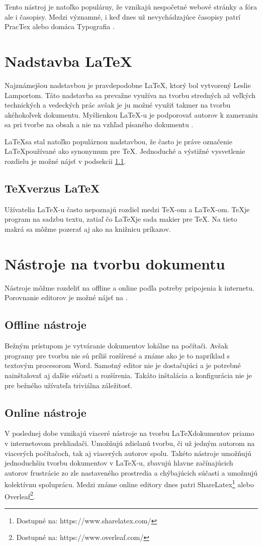 \documentclass[a4paper, 11pt] {article}
\begin{document}
Tento nástroj je natoľko populárny, že vznikajú nespočetné webové stránky a fóra ale i časopisy. Medzi významné, i keď dnes už nevychádzajúce časopisy patrí PracTex\cite{practex} alebo domáca Typografia	\cite{typografia}.

\section{Nadstavba \LaTeX}
Najznámejšou nadstavbou je pravdepodobne \LaTeX, ktorý bol vytvorený Leslie Lamportom. Táto nadstavba sa prevažne využíva na tvorbu stredných až veľkých technických a vedeckých prác avšak je ju možné využiť takmer na tvorbu akéhokoľvek dokumentu. Myšlienkou \LaTeX-u je podporovať autorov k zameraniu sa pri tvorbe na obsah a nie na vzhľad písaného dokumentu \cite{latex_webpage}. 

\LaTeX sa stal natoľko populárnou nadstavbou, že často je práve označenie \LaTeX používané ako synonymum pre \TeX. Jednoduché a výstižné vysvetlenie rozdielu je možné nájsť v podsekcii \ref{tex_vs_latex}.

\subsection{\TeX verzus \LaTeX}
\label{tex_vs_latex}
Užívatelia \LaTeX-u často nepoznajú rozdiel medzi \TeX-om a \LaTeX-om. \TeX je program na sadzbu textu, zatiaľ čo \LaTeX je sada makier pre \TeX. Na tieto makrá sa môžme pozerať aj ako na knižnicu príkazov\cite{mks}.


\section{Nástroje na tvorbu dokumentu}
Nástroje môžme rozdeliť na offline a online podľa potreby pripojenia k internetu. Porovnanie editorov je možné nájsť na \cite{prekladace_wiki}.	

\subsection{Offline nástroje}
Bežným prístupom je vytváranie dokumentov lokálne na počítači. Avšak programy pre tvorbu nie sú príliš rozšírené a známe ako je to napríklad s textovým procesorom Word. Samotný editor nie je dostačujúci a je potrebné nainštalovať aj daľšie súčasti a rozšírenia. Takáto inštalácia a konfigurácia nie je pre bežného užívateľa triviálna záležitosť\cite{sokol}.


\subsection{Online nástroje}
V poslednej dobe vznikajú viaceré nástroje na tvorbu \LaTeX dokumentov priamo v internetovom prehliadači. Umožňujú zdielanú tvorbu, či už jedným autorom na viacerých počítačoch, tak aj viacerých autorov spolu. Takéto nástroje umožňujú jednoduchšiu tvorbu dokumentov v \LaTeX-u, zbavujú hlavne začínajúcich autorov frustrácie zo zle nastaveného prostredia a chýbajúcich súčasti a umožnujú kolektívnu spoluprácu\cite{online_tex}. Medzi známe online editory dnes patri ShareLatex\footnote{Dostupné na: https://www.sharelatex.com/} alebo Overleaf\footnote{Dostupné na: https://www.overleaf.com/}.
\end{document}
